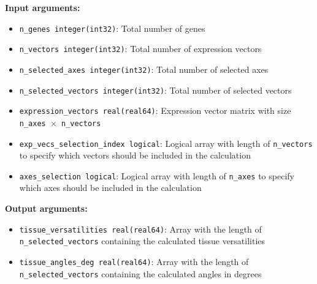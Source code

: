 \documentclass[11pt]{article}
\begin{document}
\begin{enumerate}
\begin{enumerate}
	      	      \textbf{Input arguments:}
	      	      \begin{itemize}
	      	      	\item \texttt{n\_genes integer(int32)}: Total number of genes
	      	      	      
	      	      	\item \texttt{n\_vectors integer(int32)}: Total number of expression
	      	      	      vectors
	      	      	      
	      	      	\item \texttt{n\_selected\_axes integer(int32)}: Total number of selected
	      	      	      axes
	      	      	      
	      	      	\item \texttt{n\_selected\_vectors integer(int32)}: Total number of selected
	      	      	      vectors
	      	      	      
	      	      	\item \texttt{expression\_vectors real(real64)}: Expression vector matrix
	      	      	      with size \texttt{n\_axes $\times$ n\_vectors}
	      	      	      
	      	      	\item \texttt{exp\_vecs\_selection\_index logical}: Logical array with
	      	      	      length of \texttt{n\_vectors} to specify which vectors should be
	      	      	      included in the calculation
	      	      	      
	      	      	\item \texttt{axes\_selection logical}: Logical array with length of
	      	      	      \texttt{n\_axes} to specify which axes should be included in the
	      	      	      calculation
	      	      \end{itemize}
	      	      
	      	      \textbf{Output arguments:}
	      	      \begin{itemize}
	      	      	\item \texttt{tissue\_versatilities real(real64)}: Array with the length
	      	      	      of \texttt{n\_selected\_vectors} containing the calculated tissue
	      	      	      versatilities
	      	      	      
	      	      	\item \texttt{tissue\_angles\_deg real(real64)}: Array with the length
	      	      	      of \texttt{n\_selected\_vectors} containing the calculated angles
	      	      	      in degrees
	      	      	      

\end{itemize}
\end{enumerate}
\end{enumerate}
\end{document}
